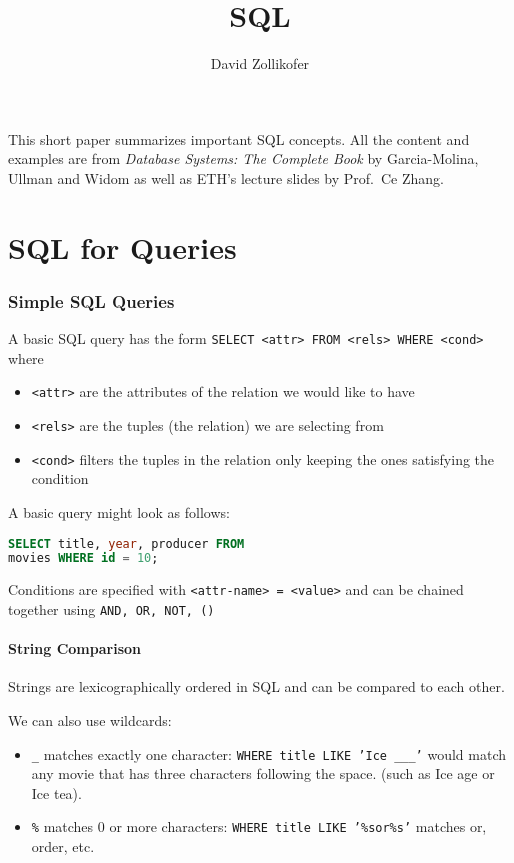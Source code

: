 \documentclass{article}
\title{\huge{SQL}}
\author{\Large David Zollikofer}
\renewcommand{\t}[1]{\texttt{#1}}
\begin{document}
\maketitle



This short paper summarizes important SQL concepts. All the content and examples are from \textit{Database Systems: The Complete Book} by Garcia-Molina, Ullman and Widom as well as ETH's lecture slides by Prof.\ Ce Zhang.

\part{SQL for Queries}

\section*{Simple SQL Queries}

A basic SQL query has the form \t{SELECT <attr> FROM <rels> WHERE <cond>} where 
\begin{itemize}
	\item \t{<attr>} are the attributes of the relation we would like to have
	\item \t{<rels>} are the tuples (the relation) we are selecting from
	\item \t{<cond>} filters the tuples in the relation only keeping the ones satisfying the condition
\end{itemize}

A basic query might look as follows:

\begin{lstlisting}[language=SQL]
SELECT title, year, producer FROM
movies WHERE id = 10;
\end{lstlisting}

Conditions are specified with \t{<attr-name> = <value>} and can be chained together using \t{AND, OR, NOT, ()}

\subsection*{String Comparison}

Strings are lexicographically ordered in SQL and can be compared to each other.

We can also use wildcards:
\begin{itemize}
	\item \t{\_} matches exactly one character: \t{WHERE title LIKE 'Ice \_\_\_'} would match any movie that has three characters following the space. (such as Ice age or Ice tea).
	\item\t{\%} matches 0 or more characters: \t{WHERE title LIKE '\%sor\%s'} matches or, order, etc.
\end{itemize}
\end{document}
